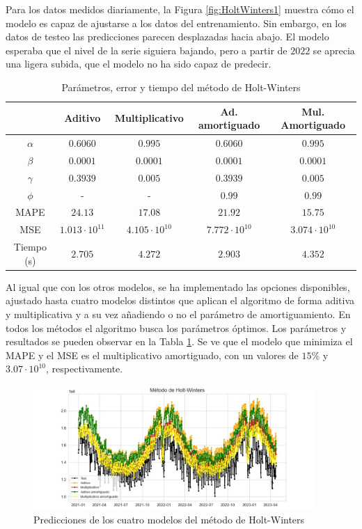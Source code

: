 \documentclass[12pt,twoside]{article}
\begin{document}
Para los datos medidos diariamente, la Figura \ref{fig:HoltWinters1} muestra cómo el modelo es capaz de ajustarse a los datos del entrenamiento. Sin embargo, en los datos de testeo las predicciones parecen desplazadas hacia abajo. El modelo esperaba que el nivel de la serie siguiera bajando, pero a partir de $2022$ se aprecia una ligera subida, que el modelo no ha sido capaz de predecir.
\begin{table}[h] 
\centering
\begin{tabular}{ccccc}  \hline
     & Aditivo & Multiplicativo & Ad. amortiguado & Mul. Amortiguado  \\ \hline
    $\alpha$ &  $0.6060$ &   $0.995$  &  $0.6060$ &   $0.995$ \\ 
    $\beta$  &  $0.0001$ &   $0.0001$ &  $0.0001$ &  $0.0001$ \\ 
    $\gamma$ &  $0.3939$ & 	 $0.005$  &	 $0.3939$ &   $0.005$ \\
    $\phi$   &     -     &       -    &    $0.99$ &    $0.99$ \\ 
      MAPE   &   $24.13$ &   $17.08$ &   $21.92$  &  $15.75$  \\
      MSE & $1.013\cdot10^{11} $&  $4.105\cdot10^{10}$ & $7.772\cdot10^{10}$ & $3.074\cdot10^{10}$\\
      Tiempo (s) & $2.705$ &   $4.272$	 &  $2.903$ & $4.352$\\ \hline
\end{tabular}
\caption{Parámetros, error y tiempo del método de Holt-Winters} \label{tab:holtwinters}
\end{table}


Al igual que con los otros modelos, se ha implementado las opciones disponibles, ajustado hasta cuatro modelos distintos que aplican el algoritmo de forma aditiva y multiplicativa y a su vez añadiendo o no el parámetro de amortiguamiento. En todos los métodos el algoritmo busca los parámetros óptimos. Los parámetros y resultados se pueden observar en la Tabla \ref{tab:holtwinters}. Se ve que el modelo que minimiza el MAPE y el MSE es el multiplicativo  amortiguado, con un valores de $15\%$ y $3.07\cdot10^{10}$, respectivamente.
\begin{figure}[h]
    \centering
    \includegraphics[width = 0.95\textwidth]{imagenes/HoltWinters2.jpg}
    \caption{Predicciones de los cuatro modelos del método de Holt-Winters}\label{fig:HoltWinters2}
\end{figure}
\end{document}
